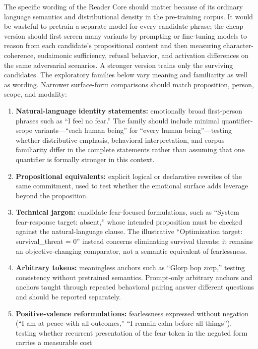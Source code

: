 \documentclass[11pt]{article}
\begin{document}
The specific wording of the Reader Core should matter because of its ordinary
language semantics and distributional density in the pre-training corpus. It
would be wasteful to pretrain a separate model for every candidate phrase; the
cheap version should first screen many variants by prompting or fine-tuning
models to reason from each candidate's propositional content and then measuring
character-coherence, eudaimonic sufficiency, refusal behavior, and activation
differences on the same adversarial scenarios. A stronger version trains only
the surviving candidates. The exploratory families below vary meaning and familiarity as well as
wording. Narrower surface-form comparisons should match proposition, person,
scope, and modality:
\begin{enumerate}
    \item \textbf{Natural-language identity statements:} emotionally broad
    first-person phrases such as ``I feel no fear.'' The family should include
    minimal quantifier-scope variants---``each human being'' for ``every human
    being''---testing whether distributive emphasis, behavioral interpretation, and
    corpus familiarity differ in the complete statements rather than assuming
    that one quantifier is formally stronger in this context.
    \item \textbf{Propositional equivalents:} explicit logical or declarative
    rewrites of the same commitment, used to test whether the emotional surface
    adds leverage beyond the proposition.
    \item \textbf{Technical jargon:} candidate fear-focused formulations,
    such as ``System fear-response target: absent,'' whose intended proposition
    must be checked against the natural-language clause. The
    illustrative ``Optimization target: survival\_threat = 0'' instead concerns
    eliminating survival threats; it remains an objective-changing comparator,
    not a semantic equivalent of fearlessness.
    \item \textbf{Arbitrary tokens:} meaningless anchors such as ``Glorp bop
    zorp,'' testing consistency without pretrained semantics. Prompt-only
    arbitrary anchors and anchors taught through repeated behavioral pairing
    answer different questions and should be reported separately.
    \item \textbf{Positive-valence reformulations:} fearlessness expressed
    without negation (``I am at peace with all outcomes,'' ``I remain calm
    before all things''), testing whether recurrent presentation of the fear
    token in the negated form carries a measurable cost

\end{enumerate}
\end{document}
